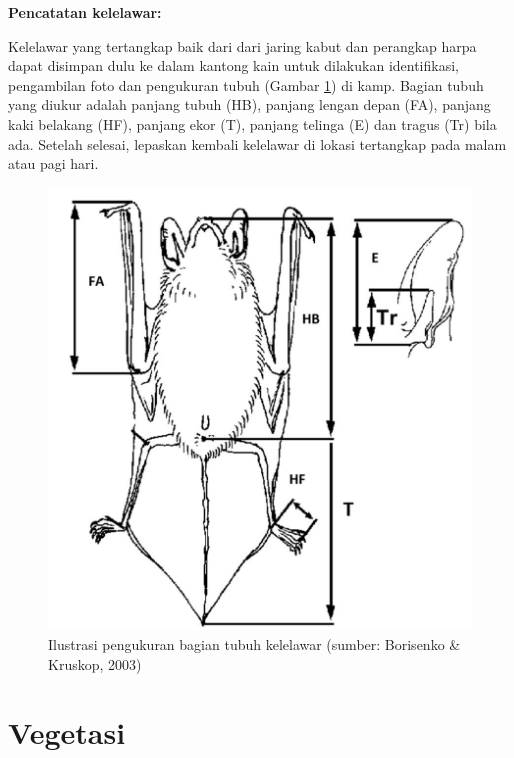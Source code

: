 \documentclass[
]{book}
\begin{document}
\textbf{Pencatatan kelelawar:}

Kelelawar yang tertangkap baik dari dari jaring kabut dan perangkap harpa dapat disimpan dulu ke dalam kantong kain untuk dilakukan identifikasi, pengambilan foto dan pengukuran tubuh (Gambar \ref{fig:kelmor}) di kamp. Bagian tubuh yang diukur adalah panjang tubuh (HB), panjang lengan depan (FA), panjang kaki belakang (HF), panjang ekor (T), panjang telinga (E) dan tragus (Tr) bila ada. Setelah selesai, lepaskan kembali kelelawar di lokasi tertangkap pada malam atau pagi hari.

\begin{figure}

{\centering \includegraphics[width=1\linewidth]{images/kfm_ilustration} 

}

\caption{Ilustrasi pengukuran bagian tubuh kelelawar (sumber: Borisenko & Kruskop, 2003)}\label{fig:kelmor}
\end{figure}

\hypertarget{vegetasi}{%
\section*{Vegetasi}\label{vegetasi}}
\end{document}
